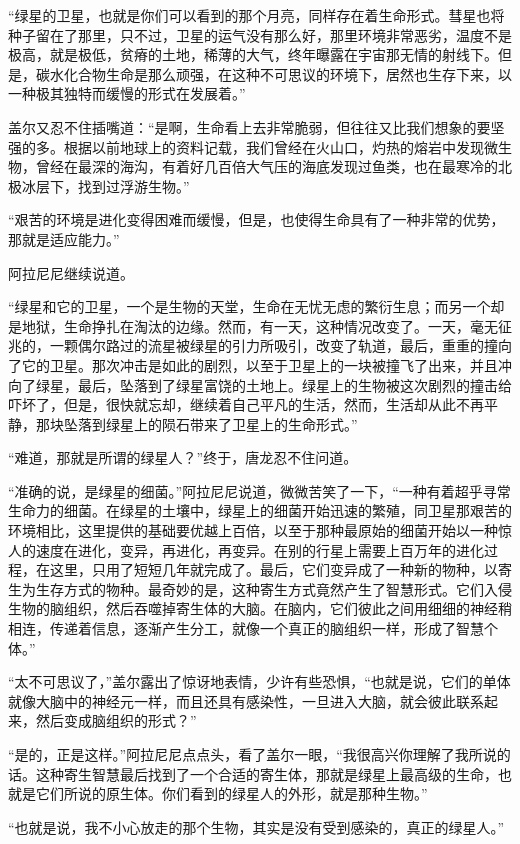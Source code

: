 “绿星的卫星，也就是你们可以看到的那个月亮，同样存在着生命形式。彗星也将种子留在了那里，只不过，卫星的运气没有那么好，那里环境非常恶劣，温度不是极高，就是极低，贫瘠的土地，稀薄的大气，终年曝露在宇宙那无情的射线下。但是，碳水化合物生命是那么顽强，在这种不可思议的环境下，居然也生存下来，以一种极其独特而缓慢的形式在发展着。”

盖尔又忍不住插嘴道：“是啊，生命看上去非常脆弱，但往往又比我们想象的要坚强的多。根据以前地球上的资料记载，我们曾经在火山口，灼热的熔岩中发现微生物，曾经在最深的海沟，有着好几百倍大气压的海底发现过鱼类，也在最寒冷的北极冰层下，找到过浮游生物。”

“艰苦的环境是进化变得困难而缓慢，但是，也使得生命具有了一种非常的优势，那就是适应能力。”

阿拉尼尼继续说道。

“绿星和它的卫星，一个是生物的天堂，生命在无忧无虑的繁衍生息；而另一个却是地狱，生命挣扎在淘汰的边缘。然而，有一天，这种情况改变了。一天，毫无征兆的，一颗偶尔路过的流星被绿星的引力所吸引，改变了轨道，最后，重重的撞向了它的卫星。那次冲击是如此的剧烈，以至于卫星上的一块被撞飞了出来，并且冲向了绿星，最后，坠落到了绿星富饶的土地上。绿星上的生物被这次剧烈的撞击给吓坏了，但是，很快就忘却，继续着自己平凡的生活，然而，生活却从此不再平静，那块坠落到绿星上的陨石带来了卫星上的生命形式。”

“难道，那就是所谓的绿星人？”终于，唐龙忍不住问道。

“准确的说，是绿星的细菌。”阿拉尼尼说道，微微苦笑了一下，“一种有着超乎寻常生命力的细菌。在绿星的土壤中，绿星上的细菌开始迅速的繁殖，同卫星那艰苦的环境相比，这里提供的基础要优越上百倍，以至于那种最原始的细菌开始以一种惊人的速度在进化，变异，再进化，再变异。在别的行星上需要上百万年的进化过程，在这里，只用了短短几年就完成了。最后，它们变异成了一种新的物种，以寄生为生存方式的物种。最奇妙的是，这种寄生方式竟然产生了智慧形式。它们入侵生物的脑组织，然后吞噬掉寄生体的大脑。在脑内，它们彼此之间用细细的神经稍相连，传递着信息，逐渐产生分工，就像一个真正的脑组织一样，形成了智慧个体。”

“太不可思议了，”盖尔露出了惊讶地表情，少许有些恐惧，“也就是说，它们的单体就像大脑中的神经元一样，而且还具有感染性，一旦进入大脑，就会彼此联系起来，然后变成脑组织的形式？”

“是的，正是这样。”阿拉尼尼点点头，看了盖尔一眼，“我很高兴你理解了我所说的话。这种寄生智慧最后找到了一个合适的寄生体，那就是绿星上最高级的生命，也就是它们所说的原生体。你们看到的绿星人的外形，就是那种生物。”

“也就是说，我不小心放走的那个生物，其实是没有受到感染的，真正的绿星人。”

